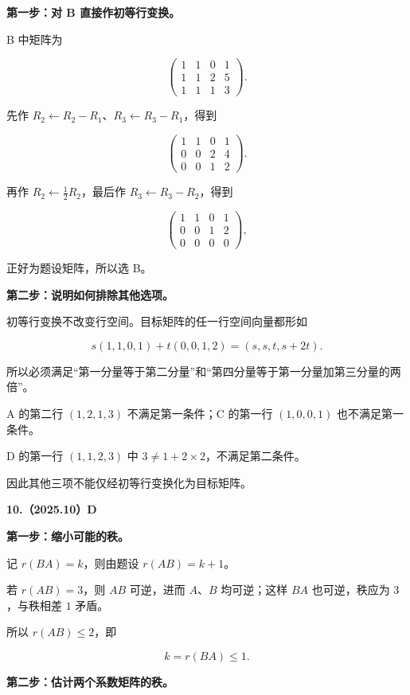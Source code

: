 \documentclass[UTF8,11pt,fontset=windows]{ctexart}
\begin{document}
\textbf{第一步：对 B 直接作初等行变换。}

B 中矩阵为

$$
\begin{pmatrix}
1&1&0&1\\
1&1&2&5\\
1&1&1&3
\end{pmatrix}.
$$

先作 $R_2\leftarrow R_2-R_1$、$R_3\leftarrow R_3-R_1$，得到

$$
\begin{pmatrix}
1&1&0&1\\
0&0&2&4\\
0&0&1&2
\end{pmatrix}.
$$

再作 $R_2\leftarrow\frac12R_2$，最后作 $R_3\leftarrow R_3-R_2$，得到

$$
\begin{pmatrix}
1&1&0&1\\
0&0&1&2\\
0&0&0&0
\end{pmatrix},
$$

正好为题设矩阵，所以选 B。

\textbf{第二步：说明如何排除其他选项。}

初等行变换不改变行空间。目标矩阵的任一行空间向量都形如

$$
s(1,1,0,1)+t(0,0,1,2)=(s,s,t,s+2t).
$$

所以必须满足“第一分量等于第二分量”和“第四分量等于第一分量加第三分量的两倍”。

A 的第二行 $(1,2,1,3)$ 不满足第一条件；C 的第一行 $(1,0,0,1)$ 也不满足第一条件。

D 的第一行 $(1,1,2,3)$ 中 $3\ne1+2\times2$，不满足第二条件。

因此其他三项不能仅经初等行变换化为目标矩阵。

\clearpage

\textbf{10.（2025.10）D}

\textbf{第一步：缩小可能的秩。}

记 $r(BA)=k$，则由题设 $r(AB)=k+1$。

若 $r(AB)=3$，则 $AB$ 可逆，进而 $A$、$B$ 均可逆；这样 $BA$ 也可逆，秩应为 $3$，与秩相差 $1$ 矛盾。

所以 $r(AB)\le2$，即

$$
k=r(BA)\le1.
$$

\textbf{第二步：估计两个系数矩阵的秩。}
\end{document}
